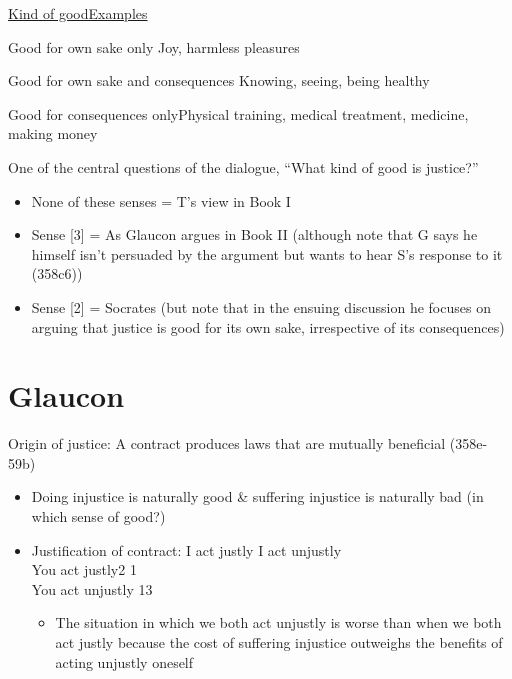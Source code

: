 \documentclass[11pt]{article}
\begin{document}
\noindent\underline{Kind of good}\hspace*{55mm}\underline{Examples}
\vspace*{2mm}

\noindent [1] Good for own sake only\hspace*{32mm} Joy, harmless pleasures

\noindent [2] Good for own sake and consequences\hspace*{11mm} Knowing, seeing, being healthy

\noindent [3] Good for consequences only\hspace*{26mm}Physical training, medical treatment, medicine,\\\hspace*{75mm}making money
\vspace*{2mm}

\noindent One of the central questions of the dialogue, ``What kind of good is justice?''
\begin{itemize}\item{None of these senses = T's view in Book I}\item{Sense [3] = As Glaucon argues in Book II (although note that G says he himself isn't persuaded by the argument but wants to hear S's response to it (358c6))}\item{Sense [2] = Socrates (but note that in the ensuing discussion he focuses on arguing that justice is good for its own sake, irrespective of its consequences)}\end{itemize}
\vspace*{-6mm}

\section*{Glaucon}

\noindent Origin of justice: A contract produces laws that are mutually beneficial (358e-59b)

\begin{itemize}
\item{Doing injustice is naturally good \& suffering injustice is naturally bad (in which sense of good?)}
\item{Justification of contract: I act justly\hspace*{5mm} I act unjustly\\\hspace*{14mm} You act justly\hspace*{8mm}2\hspace*{20mm} 1\\\hspace*{14mm}You act unjustly\hspace*{4mm} 1\hspace*{21mm}3}\begin{itemize}\item{The situation in which we both act unjustly is worse than when we both act justly because the cost of suffering injustice outweighs the benefits of acting unjustly oneself}\end{itemize}
\end{itemize}
\end{document}
